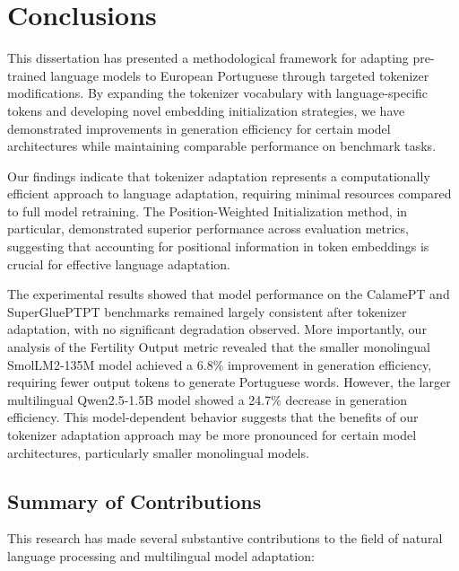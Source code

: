 
\chapter{Conclusions}


\label{chap:conclusions}
This dissertation has presented a methodological framework for adapting pre-trained language models to European Portuguese through targeted tokenizer modifications. By expanding the tokenizer vocabulary with language-specific tokens and developing novel embedding initialization strategies, we have demonstrated improvements in generation efficiency for certain model architectures while maintaining comparable performance on benchmark tasks.

Our findings indicate that tokenizer adaptation represents a computationally efficient approach to language adaptation, requiring minimal resources compared to full model retraining. The Position-Weighted Initialization method, in particular, demonstrated superior performance across evaluation metrics, suggesting that accounting for positional information in token embeddings is crucial for effective language adaptation.

The experimental results showed that model performance on the CalamePT and SuperGluePTPT benchmarks remained largely consistent after tokenizer adaptation, with no significant degradation observed. More importantly, our analysis of the Fertility Output metric revealed that the smaller monolingual SmolLM2-135M model achieved a 6.8\% improvement in generation efficiency, requiring fewer output tokens to generate Portuguese words. However, the larger multilingual Qwen2.5-1.5B model showed a 24.7\% decrease in generation efficiency. This model-dependent behavior suggests that the benefits of our tokenizer adaptation approach may be more pronounced for certain model architectures, particularly smaller monolingual models.

\section{Summary of Contributions}
This research has made several substantive contributions to the field of natural language processing and multilingual model adaptation:

